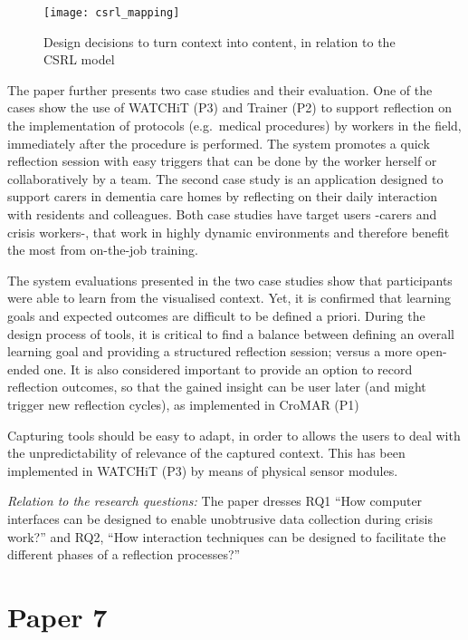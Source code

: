 \begin{figure}[tbh]
    \centering
    \texttt{[image: csrl\_mapping]}
    \caption{Design decisions to turn context into content, in relation to the CSRL model}
    \label{fig:csrl-mapping}
\end{figure}

The paper further presents two case studies and their evaluation. One of
the cases show the use of WATCHiT (P3) and Trainer (P2) to support
reflection on the implementation of protocols (e.g.~medical procedures)
by workers in the field, immediately after the procedure is performed.
The system promotes a quick reflection session with easy triggers that
can be done by the worker herself or collaboratively by a team. The
second case study is an application designed to support carers in
dementia care homes by reflecting on their daily interaction with
residents and colleagues. Both case studies have target users -carers
and crisis workers-, that work in highly dynamic environments and
therefore benefit the most from on-the-job training.

The system evaluations presented in the two case studies show that
participants were able to learn from the visualised context. Yet, it is
confirmed that learning goals and expected outcomes are difficult to be
defined a priori. During the design process of tools, it is critical to
find a balance between defining an overall learning goal and providing a
structured reflection session; versus a more open-ended one. It is also
considered important to provide an option to record reflection outcomes,
so that the gained insight can be user later (and might trigger new
reflection cycles), as implemented in CroMAR (P1)

Capturing tools should be easy to adapt, in order to allows the users to
deal with the unpredictability of relevance of the captured context.
This has been implemented in WATCHiT (P3) by means of physical sensor
modules.

\emph{Relation to the research questions: } The paper dresses RQ1 ``How
computer interfaces can be designed to enable unobtrusive data
collection during crisis work?'' and RQ2, ``How interaction techniques
can be designed to facilitate the different phases of a reflection
processes?''

\section{Paper 7}\label{paper-7}


